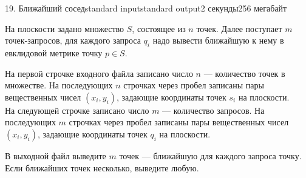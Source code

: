\begin{problem}{19. Ближайший сосед}{standard input}{standard output}{2 секунды}{256 мегабайт}

На плоскости задано множество $S$, состоящее из $n$ точек. Далее поступает $m$ точек-запросов, для каждого запроса $q_i$ надо вывести ближайшую к нему в евклидовой метрике точку $p \in S$.

\InputFile

На первой строчке входного файла записано число $n$ — количество точек в множестве. На последующих $n$ строчках через пробел записаны пары вещественных чисел $(x_i, y_i)$, задающие координаты точек $s_i$ на плоскости. \\
На следующей строчке записано число $m$ — количество запросов. На последующих $m$ строчках через пробел записаны пары вещественных чисел $(x_i, y_i)$, задающие координаты точек $q_i$ на плоскости. 

\OutputFile
В выходной файл выведите $m$ точек — ближайшую для каждого запроса точку. Если ближайших точек несколько, выведите любую.

\Examples

\begin{example}%
%
\end{example}

\begin{example}
%
\end{example}

\end{problem}

